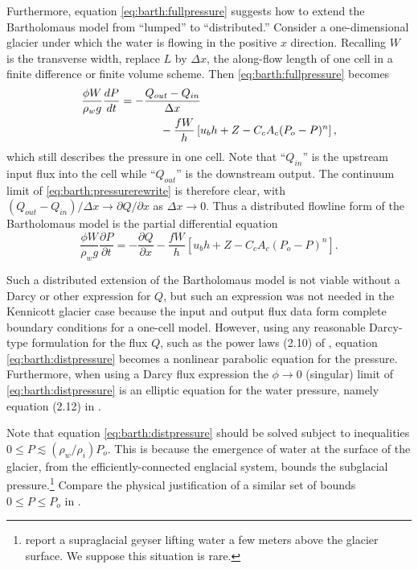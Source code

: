 \documentclass[review,letterpaper]{igs}
\begin{document}
Furthermore, equation \eqref{eq:barth:fullpressure} suggests how to extend the Bartholomaus model from ``lumped'' to ``distributed.''  Consider a one-dimensional glacier under which the water is flowing in the positive $x$ direction.  Recalling $W$ is the transverse width, replace $L$ by $\Delta x$, the along-flow length of one cell in a finite difference or finite volume scheme.  Then \eqref{eq:barth:fullpressure} becomes
\begin{align}
&\frac{\phi W}{\rho_w g}\frac{dP}{dt} = - \frac{Q_{out} - Q_{in}}{\Delta x}  \label{eq:barth:pressurerewrite} \\
&\qquad \qquad \qquad \quad - \frac{f W}{h} \left[u_b h + Z - C_c A_c (P_o-P)^n\right], \notag
\end{align}
which still describes the pressure in one cell.  Note that ``$Q_{in}$'' is the upstream input flux into the cell while ``$Q_{out}$'' is the downstream output.  The continuum limit of \eqref{eq:barth:pressurerewrite} is therefore clear, with $(Q_{out} - Q_{in})/\Delta x \to \partial Q/\partial x$ as $\Delta x \to 0$.  Thus a distributed flowline form of the Bartholomaus model is the partial differential equation
\begin{equation}
\frac{\phi W}{\rho_w g} \frac{\partial P}{\partial t} = - \frac{\partial Q}{\partial x} - \frac{f W}{h} \left[u_b h + Z - C_c A_c (P_o-P)^n\right]. \label{eq:barth:distpressure}
\end{equation}

Such a distributed extension of the Bartholomaus model is not viable without a Darcy or other expression for $Q$, but such an expression was not needed in the Kennicott glacier case because the input and output flux data form complete boundary conditions for a one-cell model.  However, using any reasonable Darcy-type formulation for the flux $Q$, such as the power laws (2.10) of \cite{Schoofetal2012}, equation \eqref{eq:barth:distpressure} becomes a nonlinear parabolic equation for the pressure.  Furthermore, when using a Darcy flux expression the $\phi\to 0$ (singular) limit of \eqref{eq:barth:distpressure} is an elliptic equation for the water pressure, namely equation (2.12) in \cite{Schoofetal2012}.

Note that equation \eqref{eq:barth:distpressure} should be solved subject to inequalities $0 \le P \lesssim (\rho_w/\rho_i) P_o$.  This is because the emergence of water at the surface of the glacier, from the efficiently-connected englacial system, bounds the subglacial pressure.\footnote{\cite{Bartholomausetal2011} report a supraglacial geyser lifting water a few meters above the glacier surface.  We suppose this situation is rare.}  Compare the physical justification of a similar set of bounds $0 \le P \le P_o$ in \cite{Schoofetal2012}.
\end{document}
